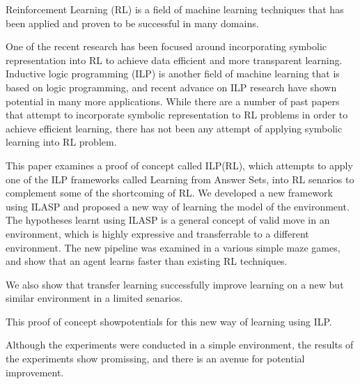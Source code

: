 Reinforcement Learning (RL) is a field of machine learning techniques that has been applied and proven to be successful in many domains.

One of the recent research has been focused around incorporating symbolic representation into RL to achieve data efficient and more transparent learning. 
Inductive logic programming (ILP) is another field of machine learning that is based on logic programming, and recent advance on ILP research have shown potential in many more applications.
While there are a number of past papers that attempt to incorporate symbolic representation to RL problems in order to achieve efficient learning, 
there has not been any attempt of applying symbolic learning into RL problem.

This paper examines a proof of concept called ILP(RL), which attempts to apply one of the ILP frameworks called Learning from Answer Sets, into RL senarios to complement some of the shortcoming of RL. 
We developed a new framework using ILASP and proposed a new way of learning the model of the environment.
The hypotheses learnt using ILASP is a general concept of valid move in an environment, which is highly expressive and transferrable to a different environment.
The new pipeline was examined in a various simple maze games, and show that an agent learns faster than existing RL techniques.

We also show that transfer learning successfully improve learning on a new but similar environment in a limited senarios.

This proof of concept showpotentials for this new way of learning using ILP.

Although the experiments were conducted in a simple environment, the results of the experiments show promissing, and there is an avenue for potential improvement.

